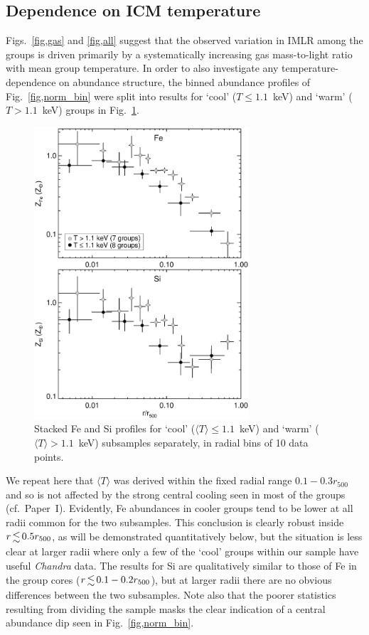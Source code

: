 \documentclass[useAMS,usenatbib]{mn2e}
\begin{document}
\subsection{Dependence on ICM temperature}\label{sec,ZT}

Figs.~\ref{fig,gas} and \ref{fig,all} suggest that the observed
variation in IMLR among the groups is driven primarily by a
systematically increasing gas mass-to-light ratio with mean group
temperature. In order to also investigate any temperature-dependence
on abundance structure, the binned abundance profiles of
Fig.~\ref{fig,norm_bin} were split into results for `cool' ($T\le
1.1$~keV) and `warm' ($T>1.1$~keV) groups in Fig.~\ref{fig,split}.
\begin{figure} 
  \includegraphics[width=80mm]{fig9.eps}
\caption{Stacked Fe and Si profiles for `cool' ($\langle T \rangle \le
  1.1$~keV) and `warm' ($\langle T \rangle > 1.1$~keV) subsamples
  separately, in radial bins of 10 data points.}
\label{fig,split} 
\end{figure} 
We repeat here that $\langle T \rangle$ was derived within the fixed
radial range $0.1-0.3r_{500}$ and so is not affected by the strong
central cooling seen in most of the groups (cf.\ Paper~I).  Evidently,
Fe abundances in cooler groups tend to be lower at all radii common
for the two subsamples. This conclusion is clearly robust inside $r\la
0.5 r_{500}$, as will be demonstrated quantitatively below, but the
situation is less clear at larger radii where only a few of the `cool'
groups within our sample have useful {\em Chandra} data.  The results
for Si are qualitatively similar to those of Fe in the group cores ($r
\la 0.1-0.2 r_{500}$), but at larger radii there are no obvious
differences between the two subsamples. Note also that the poorer
statistics resulting from dividing the sample masks the clear
indication of a central abundance dip seen in Fig.~\ref{fig,norm_bin}.
\end{document}
